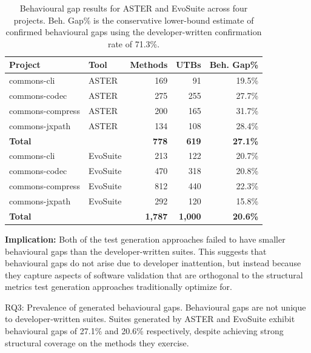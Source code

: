 \begin{table}[!t]
\centering
\caption{Behavioural gap results for ASTER and EvoSuite across four projects. 
Beh. Gap\% is the conservative lower-bound estimate of confirmed behavioural gaps using the developer-written confirmation rate of 71.3\%.}
\label{tab:rq3}
\begin{tabular}{llrrr}
\toprule
\textbf{Project} & \textbf{Tool} & \textbf{Methods} & \textbf{UTBs} & \textbf{Beh. Gap\%} \\
\midrule
commons-cli      & ASTER    & 169   & 91  & 19.5\% \\
commons-codec    & ASTER    & 275 & 255 & 27.7\% \\
commons-compress & ASTER    & 200 & 165 & 31.7\% \\
commons-jxpath   & ASTER    & 134 & 108 & 28.4\% \\ \midrule
\textbf{Total}   & & \textbf{778} & \textbf{619} & \textbf{27.1\%} \\
\midrule
\midrule
commons-cli      & EvoSuite & 213  & 122 & 20.7\% \\
commons-codec    & EvoSuite & 470 & 318 & 20.8\% \\
commons-compress & EvoSuite & 812 & 440 & 22.3\% \\
commons-jxpath   & EvoSuite & 292 & 120 & 15.8\% \\ \midrule
\textbf{Total}   &  & \textbf{1,787} & \textbf{1,000} & \textbf{20.6\%} \\
\bottomrule
\end{tabular}
\vspace{-2em}
\end{table}
\smallskip
\noindent\textbf{Implication:} Both of the test generation approaches failed to have smaller behavioural gaps than the developer-written suites. 
This suggests that behavioural gaps do not arise due to developer inattention, but instead because they capture aspects of software validation that are orthogonal to the structural metrics test generation approaches traditionally optimize for.

\begin{rqbox}{RQ3: Prevalence of generated behavioural gaps.}
Behavioural gaps are not unique to developer‑written suites. Suites generated by ASTER and EvoSuite exhibit behavioural gaps of 27.1\% and 20.6\% respectively, despite achieving strong structural coverage on the methods they exercise.
\end{rqbox}